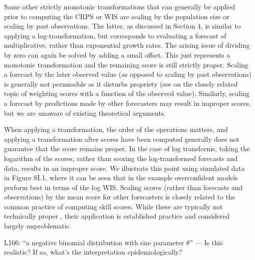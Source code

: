 \documentclass{article}
\newcommand{\blue}{\color{blue}}
\newcommand{\notindented}{\setlength{\leftskip}{0cm}}
\begin{document}
Some other strictly monotonic transformations that can generally be applied prior to computing  the CRPS or WIS are scaling by the population size or scaling by past observations. The latter, as discussed in Section 4, is similar to applying a log-transformation, but corresponds to evaluating a forecast of multiplicative, rather than exponential growth rates. The arising issue of dividing by zero can again be solved by adding a small offset. This just represents a monotonic transformation and the remaining score is still strictly proper. Scaling a forecast by the later observed value (as opposed to scaling by past observations) is generally not permissible as it disturbs propriety (see \cite{lerchForecasterDilemmaExtreme2015} on the closely related topic of weighting scores with a function of the observed value). Similarly, scaling a forecast by predictions made by other forecasters may result in improper scores, but we are unaware of existing theoretical arguments. 

When applying a transformation, the order of the operations matters, and applying a transformation after scores have been computed generally does not guarantee that the score remains proper. In the case of log transforms, taking the logarithm of the scores, rather than scoring the log-transformed forecasts and data, results in an improper score. We illustrate this point using simulated data in Figure SI.1, where it can be seen that in the example overconfident models perform best in terms of the log WIS. Scaling scores (rather than forecasts and observations) by the mean score for other forecasters is closely related to the common practice of computing skill scores. While these are typically not technically proper \citep{gneitingStrictlyProperScoring2007}, their application is established practice and considered largely unproblematic.
\notindented



\blue
L166: “a negative binomial distribution with size parameter $\theta$” — Is this realistic? If so, what’s the interpretation epidemiologically?
\end{document}
